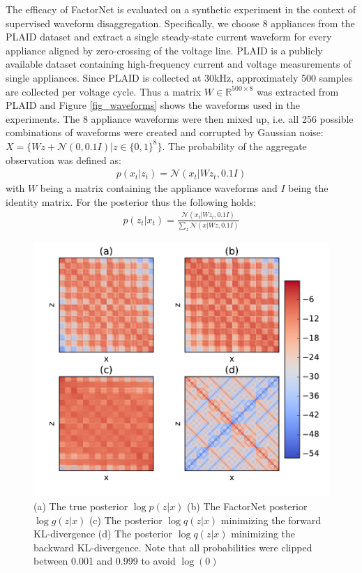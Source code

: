 The efficacy of FactorNet is evaluated on a synthetic experiment in the context of supervised waveform disaggregation. Specifically, we choose 8 appliances from the PLAID dataset\cite{gao2014plaid} and extract a single steady-state current waveform for every appliance aligned by zero-crossing of the voltage line. PLAID is a publicly available dataset containing high-frequency current and voltage measurements of single appliances. Since PLAID is collected at 30kHz, approximately 500 samples are collected per voltage cycle. Thus a matrix $W\in \mathbb{R}^{500\times8}$ was extracted from PLAID and Figure \ref{fig_waveforms} shows the waveforms used in the experiments. The 8 appliance waveforms were then mixed up, i.e. all 256 possible combinations of waveforms were created and corrupted by Gaussian noise: $X = \{Wz + \mathcal{N}(0, 0.1 I) | z \in \{0,1\}^8\}$. The probability of the aggregate observation was defined as:
\begin{align*}
p(x_t|z_t) = \mathcal{N}(x_t | Wz_t, 0.1 I)
\end{align*}
with $W$ being a matrix containing the appliance waveforms and $I$ being the identity matrix.
For the posterior thus the following holds:
\begin{align*}
p(z_t|x_t) = \frac{\mathcal{N}(x_t | Wz_t, 0.1 I)}{\sum_z \mathcal{N}(x | Wz, 0.1 I)}
\end{align*}
\begin{figure}
\centering
\includegraphics[width=0.9\linewidth]{factornet/posteriors2.pdf}
\caption[FactorNet: Performance comparison.]{(a) The true posterior $\log p(z|x)$ (b) The FactorNet posterior $\log g(z|x)$ (c) The posterior $\log q(z|x)$ minimizing the forward KL-divergence (d) The posterior $\log q(z|x)$ minimizing the backward KL-divergence. Note that all probabilities were clipped between 0.001 and 0.999 to avoid $\log(0)$}
\label{fig_posteriors}
\end{figure}

